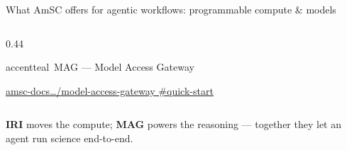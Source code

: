 \documentclass[aspectratio=169,11pt]{beamer}
\begin{document}
\begin{frame}{What AmSC offers for agentic workflows: programmable compute \& models}
\begin{columns}[t, totalwidth=\textwidth]
\begin{column}{0.44\textwidth}
\begin{featbox}{accentteal}{\faBrain\ MAG — Model Access Gateway}
\begin{itemize}
            {\scriptsize\href{https://amsc-docs-d762d2.gitlab.io/model-access-gateway/\#quick-start}{amsc-docs\ldots/model-access-gateway \#quick-start}}
        \end{itemize}
      \end{featbox}
    \end{column}
  \end{columns}
  \vspace{6pt}
  \begin{center}
    {\footnotesize\color{midgray}
      \textbf{IRI} moves the compute; \textbf{MAG} powers the reasoning — together they let an agent run science end-to-end.}
  \end{center}
\end{frame}

\end{document}
